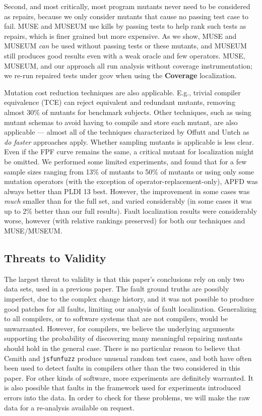 Second, and most critically, most program mutants never need to be considered as repairs, because we only consider mutants that cause no passing test case to fail.  MUSE and MUSEUM use kills by passing tests to help rank such tests as repairs, which is finer grained but more expensive.  As we show, MUSE and MUSEUM \emph{can}  be used without passing tests or these mutants, and MUSEUM still produces good results even with a weak oracle and few operators.  MUSE, MUSEUM, and our approach all run analysis without coverage instrumentation; we re-run repaired tests under gcov when using the {\bf Coverage} localization.

Mutation cost reduction techniques are also applicable.  E.g., trivial compiler equivalence (TCE) \cite{TCE} can reject equivalent and redundant mutants, removing almost 30\% of mutants for benchmark subjects. Other techniques, such as using mutant schemas to avoid having to compile and store each mutant, are also applicable --- almost all of the techniques characterized by Offutt and Untch \cite{offutt2001mutation} as \emph{do faster} approaches apply.   Whether sampling mutants \cite{RahulISSRE} is applicable is less clear.  Even if the FPF curve remains the same, a critical mutant for localization might be omitted.  We performed some limited experiments, and found that for a few sample sizes ranging from 13\% of mutants to 50\% of mutants or using only some mutation operators (with the exception of operator-replacement-only), APFD was always better than PLDI 13 best.   However, the improvement in some cases was \emph{much} smaller than for the full set, and varied considerably (in some cases it was up to 2\% better than our full results).  Fault localization results were considerably worse, however (with relative rankings preserved) for both our techniques and MUSE/MUSEUM.

\subsection{Threats to Validity}

The largest threat to validity is that this paper's conclusions rely on only two data sets, used in a previous paper.  The fault ground truths are possibly imperfect, due to the complex change history, and it was not possible to produce good patches for all faults, limiting our analysis of fault localization.  Generalizing to all compilers, or to software systems that are not compilers, would be unwarranted.  However, for compilers, we believe the underlying arguments supporting the probability of discovering many meaningful repairing mutants should hold in the general case.  There is no particular reason to believe that Csmith and {\tt jsfunfuzz} produce unusual random test cases, and both have often been used to detect faults in compilers other than the two considered in this paper.  For other kinds of software, more experiments are definitely warranted.  It is also possible that faults in the framework used for experiments introduced errors into the data.  In order to check for these problems, we will make the raw data for a re-analysis available on request.

